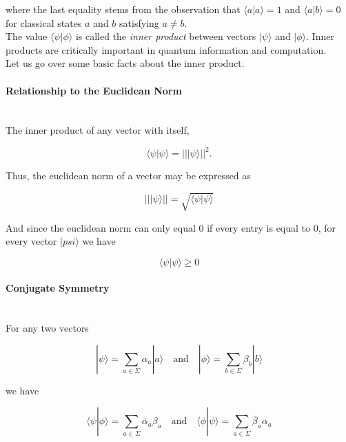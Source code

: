 \documentclass[svgnames]{article}     %
\begin{document}
where the last equality stems from the observation that $\langle a | a \rangle = 1$ and $\langle a | b \rangle = 0 $ for classical states $a$ and $b$ satisfying $a \neq b$. \\ 

The value $\langle \psi | \phi \rangle $ is called the \textit{inner product} between vectors $|\psi\rangle $ and $|\phi\rangle $. Inner products are critically important in quantum information and computation. \\

Let us go over some basic facts about the inner product. 

\paragraph{Relationship to the Euclidean Norm} \mbox{} \\

The inner product of any vector with itself, 

\[
\langle \psi | \psi \rangle = || |\psi\rangle ||^2. 
\] \vspace{5px}

Thus, the euclidean norm of a vector may be expressed as 

\[
|||\psi\rangle || = \sqrt{\langle \psi | \psi \rangle }
\] \vspace{5px}

And since the euclidean norm can only equal 0 if every entry is equal to 0, for every vector $|psi\rangle $ we have 

\[
\langle \psi | \psi \rangle \geq 0
\] \vspace{5px}

\paragraph{Conjugate Symmetry} \mbox{} \\ 

For any two vectors 

\[
|\psi\rangle  = \sum_{a\in\Sigma} \alpha_a |a\rangle \quad \text{and} \quad |\phi\rangle = \sum_{b\in\Sigma} \beta_b |b\rangle 
\] \vspace{5px}

we have 

\[
\langle \psi | \phi \rangle = \sum_{a\in\Sigma} \bar\alpha_a \beta_a \quad \text{and} \quad \langle \phi | \psi \rangle = \sum_{a\in\Sigma} \bar\beta_a\alpha_a
\] \vspace{5px}
\end{document}
